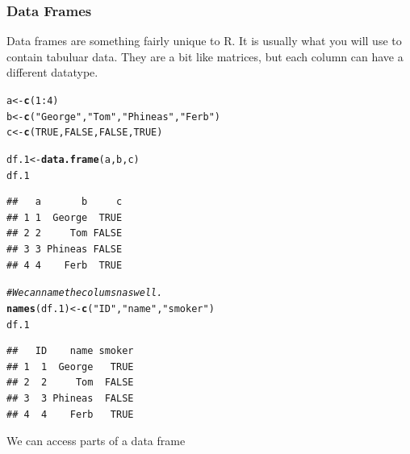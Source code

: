 \documentclass[draft]{article}\usepackage[]{graphicx}\usepackage[]{color}
\makeatletter
\newcommand{\hlnum}[1]{\textcolor[rgb]{0.686,0.059,0.569}{#1}}%
\newcommand{\hlstr}[1]{\textcolor[rgb]{0.192,0.494,0.8}{#1}}%
\newcommand{\hlcom}[1]{\textcolor[rgb]{0.678,0.584,0.686}{\textit{#1}}}%
\newcommand{\hlopt}[1]{\textcolor[rgb]{0,0,0}{#1}}%
\newcommand{\hlstd}[1]{\textcolor[rgb]{0.345,0.345,0.345}{#1}}%
\newcommand{\hlkwb}[1]{\textcolor[rgb]{0.69,0.353,0.396}{#1}}%
\newcommand{\hlkwd}[1]{\textcolor[rgb]{0.737,0.353,0.396}{\textbf{#1}}}%
\newenvironment{kframe}{%
 \def\at@end@of@kframe{}%
 \ifinner\ifhmode%
  \def\at@end@of@kframe{\end{minipage}}%
  \begin{minipage}{\columnwidth}%
 \fi\fi%
 \def\FrameCommand##1{\hskip\@totalleftmargin \hskip-\fboxsep
 \colorbox{shadecolor}{##1}\hskip-\fboxsep
     \hskip-\linewidth \hskip-\@totalleftmargin \hskip\columnwidth}%
 \MakeFramed {\advance\hsize-\width
   \@totalleftmargin\z@ \linewidth\hsize
   \@setminipage}}%
 {\par\unskip\endMakeFramed%
 \at@end@of@kframe}
\newenvironment{knitrout}{}{} %
\makeatother
\begin{document}
    \subsubsection*{Data Frames}
    Data frames are something fairly unique to R. It is usually what  you will
    use to contain tabuluar data. They are a bit like matrices, but each column 
    can have a different datatype. 
    
\begin{knitrout}
\color{fgcolor}\begin{kframe}
\begin{alltt}
  \hlstd{a} \hlkwb{<-} \hlkwd{c}\hlstd{(}\hlnum{1}\hlopt{:}\hlnum{4}\hlstd{)}
  \hlstd{b} \hlkwb{<-} \hlkwd{c}\hlstd{(}\hlstr{"George"}\hlstd{,} \hlstr{"Tom"}\hlstd{,} \hlstr{"Phineas"}\hlstd{,} \hlstr{"Ferb"}\hlstd{)}
  \hlstd{c} \hlkwb{<-} \hlkwd{c}\hlstd{(}\hlnum{TRUE}\hlstd{,} \hlnum{FALSE}\hlstd{,} \hlnum{FALSE}\hlstd{,} \hlnum{TRUE}\hlstd{)}

  \hlstd{df.1} \hlkwb{<-} \hlkwd{data.frame}\hlstd{(a, b, c)}
  \hlstd{df.1}
\end{alltt}
\begin{verbatim}
##   a       b     c
## 1 1  George  TRUE
## 2 2     Tom FALSE
## 3 3 Phineas FALSE
## 4 4    Ferb  TRUE
\end{verbatim}
\begin{alltt}
  \hlcom{# We can name the columsn as well.}
  \hlkwd{names}\hlstd{(df.1)} \hlkwb{<-} \hlkwd{c}\hlstd{(}\hlstr{"ID"}\hlstd{,} \hlstr{"name"}\hlstd{,} \hlstr{"smoker"}\hlstd{)}
  \hlstd{df.1}
\end{alltt}
\begin{verbatim}
##   ID    name smoker
## 1  1  George   TRUE
## 2  2     Tom  FALSE
## 3  3 Phineas  FALSE
## 4  4    Ferb   TRUE
\end{verbatim}
\end{kframe}
\end{knitrout}
    
    We can access parts of a data frame
    
\end{document}
